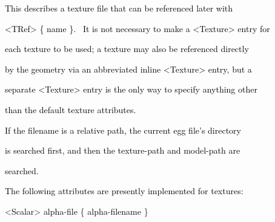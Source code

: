 \documentclass[a4paper]{article}
\newcommand\textstyleOOoComputerKeyWord[1]{\textrm{\textcolor[rgb]{0.0,0.0,0.5019608}{#1}}}
\newcommand\textstyleOOoAssemblerSpecialChar[1]{\textrm{\textcolor[rgb]{0.0,0.5019608,0.0}{#1}}}
\newcommand\textstyleOOoAssemblerIdent[1]{\textrm{\textcolor{black}{#1}}}
\begin{document}
\bigskip

{\color{black}
\textstyleOOoComputerKeyWord{\textcolor{black}{\ \ This describes a texture file that can be referenced later with}}}

{\color{black}
\textstyleOOoComputerKeyWord{\textcolor{black}{\ \ {\textless}TRef{\textgreater} \{ name \}. \ It is not necessary to
make a {\textless}Texture{\textgreater} entry for}}}

{\color{black}
\textstyleOOoComputerKeyWord{\textcolor{black}{\ \ each texture to be used; a texture may also be referenced directly}}}

{\color{black}
\textstyleOOoComputerKeyWord{\textcolor{black}{\ \ by the geometry via an abbreviated inline
{\textless}Texture{\textgreater} entry, but a}}}

{\color{black}
\textstyleOOoComputerKeyWord{\textcolor{black}{\ \ separate {\textless}Texture{\textgreater} entry is the only way to
specify anything other}}}

{\color{black}
\textstyleOOoComputerKeyWord{\textcolor{black}{\ \ than the default texture attributes.}}}


\bigskip

{\color{black}
\textstyleOOoComputerKeyWord{\textcolor{black}{\ \ If the filename is a relative path, the current egg file's
directory}}}

{\color{black}
\textstyleOOoComputerKeyWord{\textcolor{black}{\ \ is searched first, and then the texture-path and model-path are}}}

{\color{black}
\textstyleOOoComputerKeyWord{\textcolor{black}{\ \ searched.}}}


\bigskip

{\color{black}
\textstyleOOoComputerKeyWord{\textcolor{black}{\ \ The following attributes are presently implemented for textures:}}}


\bigskip

{\color{black}
\textstyleOOoComputerKeyWord{\textcolor{black}{\ \ }}\textstyleOOoAssemblerSpecialChar{{\textless}}\textstyleOOoAssemblerIdent{Scalar}\textstyleOOoAssemblerSpecialChar{{\textgreater}}\textstyleOOoComputerKeyWord{\textcolor{black}{
}}\textstyleOOoAssemblerIdent{alpha}\textstyleOOoAssemblerSpecialChar{{}-}\textstyleOOoAssemblerIdent{file}\textstyleOOoComputerKeyWord{\textcolor{black}{
}}\textstyleOOoAssemblerSpecialChar{\{}\textstyleOOoComputerKeyWord{\textcolor{black}{
}}\textstyleOOoAssemblerIdent{alpha}\textstyleOOoAssemblerSpecialChar{{}-}\textstyleOOoAssemblerIdent{filename}\textstyleOOoComputerKeyWord{\textcolor{black}{
}}\textstyleOOoAssemblerSpecialChar{\}}}
\end{document}
